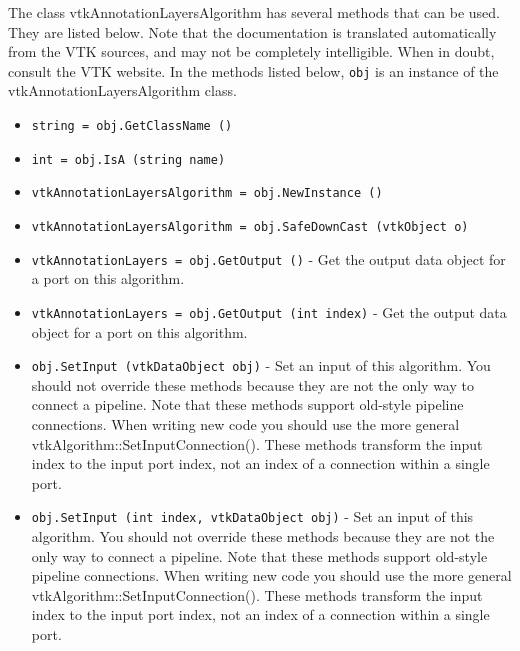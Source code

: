 The class vtkAnnotationLayersAlgorithm has several methods that can be used.
  They are listed below.
Note that the documentation is translated automatically from the VTK sources,
and may not be completely intelligible.  When in doubt, consult the VTK website.
In the methods listed below, \verb|obj| is an instance of the vtkAnnotationLayersAlgorithm class.
\begin{itemize}
\item  \verb|string = obj.GetClassName ()|

\item  \verb|int = obj.IsA (string name)|

\item  \verb|vtkAnnotationLayersAlgorithm = obj.NewInstance ()|

\item  \verb|vtkAnnotationLayersAlgorithm = obj.SafeDownCast (vtkObject o)|

\item  \verb|vtkAnnotationLayers = obj.GetOutput ()| -  Get the output data object for a port on this algorithm.

\item  \verb|vtkAnnotationLayers = obj.GetOutput (int index)| -  Get the output data object for a port on this algorithm.

\item  \verb|obj.SetInput (vtkDataObject obj)| -  Set an input of this algorithm. You should not override these
 methods because they are not the only way to connect a pipeline.
 Note that these methods support old-style pipeline connections.
 When writing new code you should use the more general
 vtkAlgorithm::SetInputConnection().  These methods transform the
 input index to the input port index, not an index of a connection
 within a single port.

\item  \verb|obj.SetInput (int index, vtkDataObject obj)| -  Set an input of this algorithm. You should not override these
 methods because they are not the only way to connect a pipeline.
 Note that these methods support old-style pipeline connections.
 When writing new code you should use the more general
 vtkAlgorithm::SetInputConnection().  These methods transform the
 input index to the input port index, not an index of a connection
 within a single port.

\end{itemize}

